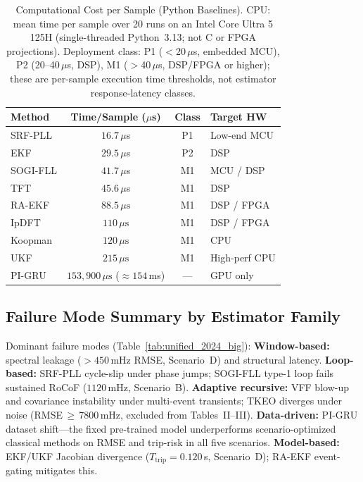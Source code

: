 \begin{table}[t!]
  \centering
  \caption{Computational Cost per Sample (Python Baselines).
    CPU: mean time per sample over 20 runs on an Intel Core Ultra 5 125H
    (single-threaded Python~3.13; not C or FPGA projections).
    Deployment class: P1 ($<$20\,$\mu$s, embedded MCU),
    P2 (20--40\,$\mu$s, DSP), M1 ($>$40\,$\mu$s, DSP/FPGA or higher);
    these are per-sample execution time thresholds, not estimator
    response-latency classes.}
  \label{tab:complexity}
  \footnotesize
  \begin{tabular}{l c c l}
    \toprule
    \textbf{Method} & \textbf{Time/Sample ($\mu$s)} & \textbf{Class}
                    & \textbf{Target HW} \\
    \midrule
    SRF-PLL  & $16.7\,\mu$s  & P1 & Low-end MCU \\
    EKF      & $29.5\,\mu$s  & P2 & DSP \\
    SOGI-FLL & $41.7\,\mu$s  & M1 & MCU / DSP \\
    TFT      & $45.6\,\mu$s  & M1 & DSP \\
    RA-EKF  & $88.5\,\mu\text{s}$ & M1 & DSP / FPGA \\
    IpDFT    & $110\,\mu\text{s}$ & M1 & DSP / FPGA \\
    Koopman  & $120\,\mu\text{s}$ & M1 & CPU \\
    UKF      & $215\,\mu\text{s}$ & M1 & High-perf CPU \\
    PI-GRU   & ${153{,}900}\,\mu\text{s}$ (${\approx}154$\,ms) & — & GPU only \\
    \bottomrule
  \end{tabular}
\end{table}

\subsection{Failure Mode Summary by Estimator Family}

Dominant failure modes (Table~\ref{tab:unified_2024_big}):
\textbf{Window-based:} spectral leakage ($>450$\,mHz RMSE, Scenario~D) and structural latency.
\textbf{Loop-based:} SRF-PLL cycle-slip under phase jumps;
SOGI-FLL type-1 loop fails sustained RoCoF ($1120$\,mHz, Scenario~B).
\textbf{Adaptive recursive:} VFF blow-up and covariance instability under multi-event
transients; TKEO diverges under noise (RMSE\,$\geq$\,7800\,mHz, excluded from Tables~II--III).
\textbf{Data-driven:} PI-GRU dataset shift---the fixed pre-trained model underperforms
scenario-optimized classical methods on RMSE and trip-risk in all five scenarios.
\textbf{Model-based:} EKF/UKF Jacobian divergence ($T_{\mathrm{trip}}\!=\!0.120$\,s,
Scenario~D); RA-EKF event-gating mitigates this.

